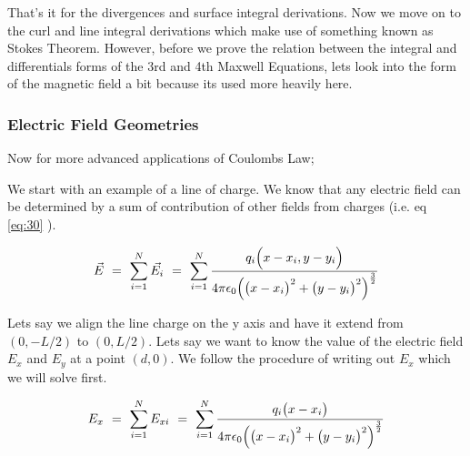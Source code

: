 \documentclass{article}
\newcounter{subsubsubsection}[subsubsection]
\begin{document}
That's it for the divergences and surface integral derivations. Now we move on to the curl and line integral derivations which make use of something known as Stokes Theorem. However, before we prove the relation between the integral and differentials forms of the 3rd and 4th Maxwell Equations, lets look into the form of the magnetic field a bit because its used more heavily here.

\subsubsection{Electric Field Geometries}

Now for more advanced applications of Coulombs Law;


We start with an example of a line of charge. We know that any electric field can be determined by a sum of contribution of other fields from charges (i.e. eq \ref{eq:30} ).

\begin{equation} \label{eq:30}
\vec{E} \hspace{0.125cm} = \hspace{0.125cm} \sum_{i=1}^{N} \vec{E_{i}} \hspace{0.125cm} = \hspace{0.125cm} \sum_{i=1}^{N} \frac{q_{i}\Big(x - x_{i} , y - y_{i} \Big)}{4\pi \epsilon_{0} \Big( \big(x - x_{i}\big)^2 + \big(y - y_{i}\big)^2 \Big)^{\frac{3}{2}}}
\end{equation}

Lets say we align the line charge on the y axis and have it extend from \begin{math} (0, -L/2) \end{math} to \begin{math} (0, L/2) \end{math}. Lets say we want to know the value of the electric field \begin{math} E_{x} \end{math} and \begin{math} E_{y}\end{math} at a point \begin{math} (d, 0) \end{math}. We follow the procedure of writing out \begin{math} E_{x} \end{math} which we will solve first. 

\begin{equation} \label{eq:31}
E_x \hspace{0.125cm} = \hspace{0.125cm} \sum_{i=1}^{N} E_{xi} \hspace{0.125cm} = \hspace{0.125cm} \sum_{i=1}^{N} \frac{q_{i}\big(x - x_{i}\big)}{4\pi \epsilon_{0} \Big( \big(x - x_{i}\big)^2 + \big(y - y_{i}\big)^2 \Big)^{\frac{3}{2}}}
\end{equation}
\end{document}
